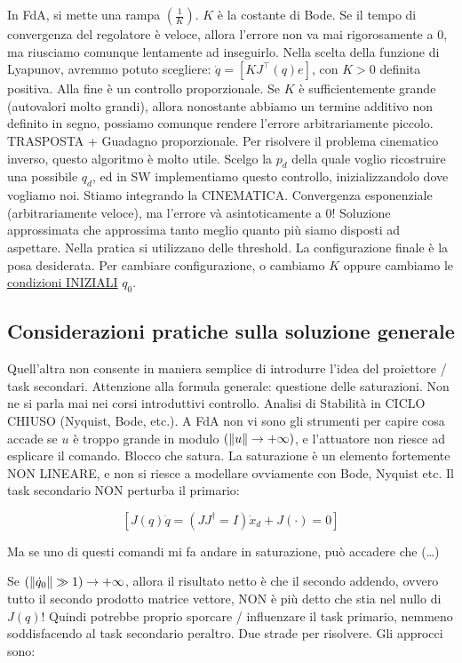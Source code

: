 In FdA, si mette una rampa $(\frac{1}{K})$. $K$ è la costante di Bode. Se il tempo di convergenza del regolatore è veloce, allora l'errore non va mai rigorosamente a 0, ma riusciamo comunque lentamente ad inseguirlo. Nella scelta della funzione di Lyapunov, avremmo potuto scegliere: $\dot{q}=[KJ^\top(q)e]$, con $K>0$ definita positiva. Alla fine è un controllo proporzionale. Se $K$ è sufficientemente grande (autovalori molto grandi), allora nonostante abbiamo un termine additivo non definito in segno, possiamo comunque rendere l'errore arbitrariamente piccolo. TRASPOSTA + Guadagno proporzionale. Per risolvere il problema cinematico inverso, questo algoritmo è molto utile. Scelgo la $p_d$ della quale voglio ricostruire una possibile $q_d$, ed in SW implementiamo questo controllo, inizializzandolo dove vogliamo noi. Stiamo integrando la CINEMATICA. Convergenza esponenziale (arbitrariamente veloce), ma l'errore và asintoticamente a 0! Soluzione approssimata che approssima tanto meglio quanto più siamo disposti ad aspettare. Nella pratica si utilizzano delle threshold. La configurazione finale è la posa desiderata. Per cambiare configurazione, o cambiamo $K$ oppure cambiamo le \underline{condizioni INIZIALI} $q_0$.

\subsection{Considerazioni pratiche sulla soluzione generale}

Quell'altra non consente in maniera semplice di introdurre l'idea del proiettore / task secondari. Attenzione alla formula generale: questione delle saturazioni. Non ne si parla mai nei corsi introduttivi controllo. Analisi di Stabilità in CICLO CHIUSO (Nyquist, Bode, etc.). A FdA non vi sono gli strumenti per capire cosa accade se $u$ è troppo grande in modulo $(\lVert u\rVert\to+\infty)$, e l'attuatore non riesce ad esplicare il comando. Blocco che satura. La saturazione è un elemento fortemente NON LINEARE, e non si riesce a modellare ovviamente con Bode, Nyquist etc. Il task secondario NON perturba il primario:

\[
	[J(q)\dot{q} = (JJ^\dag = I)\dot{x}_d + J(\mathord{\cdot}) = 0]
\]

Ma se uno di questi comandi mi fa andare in saturazione, può accadere che (\dots)

Se $(\lVert\dot{q}_0\rVert\gg 1)\to+\infty$, allora il risultato netto è che il secondo addendo, ovvero tutto il secondo prodotto matrice vettore, NON è più detto che stia nel nullo di $J(q)$! Quindi potrebbe proprio sporcare / influenzare il task primario, nemmeno soddisfacendo al task secondario peraltro. Due strade per risolvere. Gli approcci sono:

